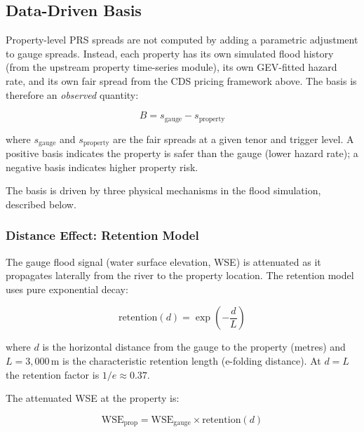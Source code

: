 \documentclass[11pt,a4paper]{article}
\begin{document}
\subsection{Data-Driven Basis}
\label{sec:basis}

Property-level PRS spreads are not computed by adding a parametric adjustment to gauge
spreads. Instead, each property has its own simulated flood history (from the upstream
property time-series module), its own GEV-fitted hazard rate, and its own fair spread
from the CDS pricing framework above. The basis is therefore an \emph{observed}
quantity:

\begin{equation}
    B = s_{\text{gauge}} - s_{\text{property}}
    \label{eq:basis_def}
\end{equation}

\noindent where $s_{\text{gauge}}$ and $s_{\text{property}}$ are the fair spreads at
a given tenor and trigger level. A positive basis indicates the property is safer than
the gauge (lower hazard rate); a negative basis indicates higher property risk.

The basis is driven by three physical mechanisms in the flood simulation, described
below.

\subsubsection{Distance Effect: Retention Model}

The gauge flood signal (water surface elevation, WSE) is attenuated as it propagates
laterally from the river to the property location. The retention model uses pure
exponential decay:

\begin{equation}
    \text{retention}(d) = \exp\!\left(-\frac{d}{L}\right)
    \label{eq:retention}
\end{equation}

\noindent where $d$ is the horizontal distance from the gauge to the property (metres)
and $L = 3{,}000$\,m is the characteristic retention length (e-folding distance). At
$d = L$ the retention factor is $1/e \approx 0.37$.

The attenuated WSE at the property is:

\begin{equation}
    \text{WSE}_{\text{prop}} = \text{WSE}_{\text{gauge}} \times \text{retention}(d)
    \label{eq:wse_prop}
\end{equation}
\end{document}
